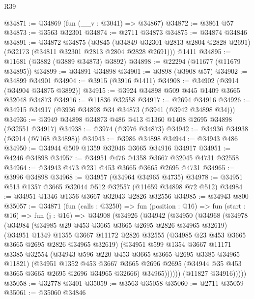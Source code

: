 \begin{lexlean}{R39}
\begin{coremodule}
@34871 := @34869 (fun (__v : @3041) => @34867)
@34872 := @3861 @57
@34873 := @3563 @32301
@34874 := @2711 @34873
@34875 := @34874 @34846
@34891 := @34872
    @34875
    (@3845 (@34849 @32301 @2813 @2804 @2828 @2691) (@32173 (@34811 @32301 @2813 @2804 @2828 @2691)))
    @1411
@34895 := @11681 (@3882 (@3889 @34873) @3892)
@34898 := @22294 (@11677 (@11679 @34895))
@34899 := @34891 @34898
@34901 := @3898 (@3908 @57)
@34902 := @34899 @34901
@34904 := @3915 (@3916 @1411)
@34908 := @34902 (@3914 (@34904 @34875 @3892))
@34915 := @3924 @34898 @509 @445 @1409 @3665 @32048 @34873
@34916 := @11836 @32558
@34917 := @2694 @34916
@34926 := @34915 @34917 (@3936 @34898 @34 @34873 (@3941 (@3942 @34898 @34)))
@34936 := @3949 @34898 @34873 @486 @413 @1360 @1408 @2695 @34898 (@32551 @34917)
@34938 := @3974 (@3976 @34873)
@34942 := @34936 @34938 (@3914 (@7168 @34898))
@34943 := @3986 @34898
@34944 := @34943 @486
@34950 := @34944 @509 @1359 @32046 @3665 @34916 @34917
@34951 := @4246 @34898
@34957 := @34951 @476 @1358 @3667 @32045 @4731 @32558
@34964 := @34943 @473 @231 @453 @3665 @3665 @2695 @4731
@34965 := @3996 @34898
@34968 := @34957 (@34964 @34965 @4735)
@34978 := @34951 @513 @1357 @3665 @32044 @512 @32557 (@11659 @34898 @72 @512)
@34984 := @34951 @1346 @1356 @3667 @32043 @2826 @32556
@34985 := @34943 @800
@35057 := @34871
    (fun (calls : @3250) =>
    fun (position : @16) =>
    fun (start : @16) =>
    fun (j : @16) =>
    @34908
      (@34926
        (@34942
          (@34950
            (@34968
              (@34978
                (@34984
                  (@34985 @29 @453 @3665 @3665 @2695 @2826 @34965 @32619)
                  (@34951
                    @1349
                    @1355
                    @3667
                    @11172
                    @2826
                    @32555
                    (@34985 @23 @453 @3665 @3665 @2695 @2826 @34965 @32619)
                    (@34951
                      @599
                      @1354
                      @3667
                      @11171
                      @3385
                      @32554
                      (@34943 @596 @220 @453 @3665 @3665 @2695 @3385 @34965 @11821)
                      (@34951
                        @1352
                        @453
                        @3667
                        @3665
                        @2696
                        @2695
                        (@34944 @35 @453 @3665 @3665 @2695 @2696 @34965 @32666)
                        @34965))))))
            (@11827 @34916)))))
@35058 := @32778 @3401
@35059 := @3563 @35058
@35060 := @2711 @35059
@35061 := @35060 @34846

\end{coremodule}
\end{lexlean}
